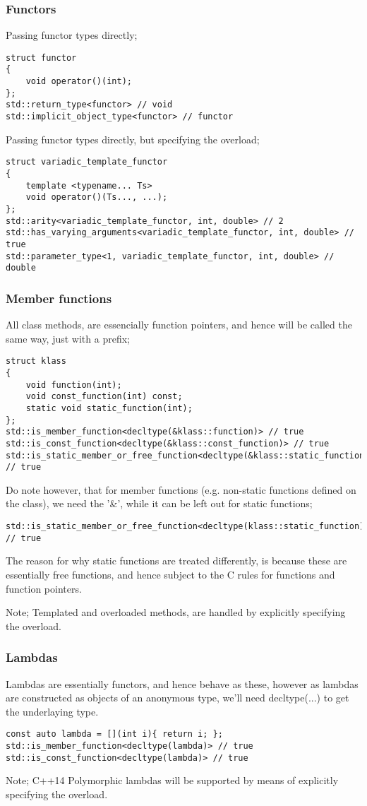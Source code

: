 \subsubsection{Functors}
Passing functor types directly;
\begin{verbatim}
struct functor
{
    void operator()(int);
};
std::return_type<functor> // void
std::implicit_object_type<functor> // functor
\end{verbatim}
Passing functor types directly, but specifying the overload;
\begin{verbatim}
struct variadic_template_functor
{
    template <typename... Ts>
    void operator()(Ts..., ...);
};
std::arity<variadic_template_functor, int, double> // 2
std::has_varying_arguments<variadic_template_functor, int, double> // true
std::parameter_type<1, variadic_template_functor, int, double> // double
\end{verbatim}

\subsubsection{Member functions}
All class methods, are essencially function pointers, and hence will be called
the same way, just with a prefix;
\begin{verbatim}
struct klass
{
    void function(int);
    void const_function(int) const;
    static void static_function(int);
};
std::is_member_function<decltype(&klass::function)> // true
std::is_const_function<decltype(&klass::const_function)> // true
std::is_static_member_or_free_function<decltype(&klass::static_function)> // true
\end{verbatim}
Do note however, that for member functions (e.g. non-static functions defined on
the class), we need the '\&', while it can be left out for static functions;
\begin{verbatim}
std::is_static_member_or_free_function<decltype(klass::static_function)> // true
\end{verbatim}
The reason for why static functions are treated differently, is because these
are essentially free functions, and hence subject to the C rules for functions
and function pointers. 

Note; Templated and overloaded methods, are handled by explicitly specifying the
overload.

\subsubsection{Lambdas}
Lambdas are essentially functors, and hence behave as these, however as lambdas
are constructed as objects of an anonymous type, we'll need decltype(...) to get
the underlaying type.
\begin{verbatim}
const auto lambda = [](int i){ return i; };
std::is_member_function<decltype(lambda)> // true
std::is_const_function<decltype(lambda)> // true
\end{verbatim}
Note; C++14 Polymorphic lambdas will be supported by means of explicitly specifying the
overload.

